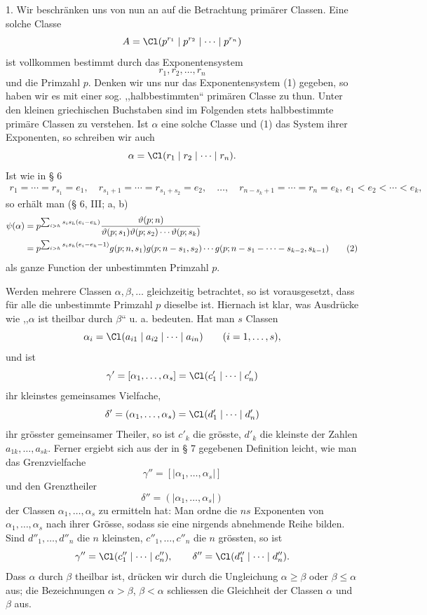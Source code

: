 1. Wir beschränken uns von nun an auf die Betrachtung primärer Classen. Eine solche Classe
\[
 A=\Cl(p^{r_1}\mid p^{r_2}\mid\cdots\mid p^{r_n})
\]
ist vollkommen bestimmt durch das Exponentensystem
\begin{equation}
 r_1,r_2,\ldots,r_n
\tag{1}
\end{equation}
und die Primzahl $p$. Denken wir uns nur das Exponentensystem (1) gegeben, so haben wir es mit einer sog. ,,halbbestimmten`` primären Classe zu thun. Unter den kleinen griechischen Buchstaben sind im Folgenden stets halbbestimmte primäre Classen zu verstehen. Ist $\alpha$ eine solche Classe und (1) das System ihrer Exponenten, so schreiben wir auch
\[
 \alpha=\Cl(r_1\mid r_2\mid\cdots\mid r_n).
\]
Ist wie in § 6
\[
\begin{gathered}
 r_1=\cdots=r_{s_1}=e_1,
 \quad r_{s_1+1}=\cdots=r_{s_1+s_2}=e_2,
 \quad \ldots,\quad
 r_{n-s_k+1}=\cdots=r_n=e_k,\
 e_1<e_2<\cdots<e_k,
\end{gathered}
\]
so erhält man (§ 6, III; a, b)
\begin{align}
\psi(\alpha)
&=p^{\sum_{i>h}s_i s_h(e_i-e_h)}
 {\vartheta(p;n)\over \vartheta(p;s_1)\vartheta(p;s_2)\cdots\vartheta(p;s_k)} \notag\\
&=p^{\sum_{i>h}s_i s_h(e_i-e_h-1)}
 g(p;n,s_1)g(p;n-s_1,s_2)\cdots
 g(p;n-s_1-\cdots-s_{k-2},s_{k-1})
\tag{2}
\end{align}
als ganze Function der unbestimmten Primzahl $p$.

Werden mehrere Classen $\alpha,\beta,\ldots$ gleichzeitig betrachtet, so ist vorausgesetzt, dass für alle die unbestimmte Primzahl $p$ dieselbe ist. Hiernach ist klar, was Ausdrücke wie ,,$\alpha$ ist theilbar durch $\beta$`` u. a. bedeuten. Hat man $s$ Classen
\[
 \alpha_i=\Cl(a_{i1}\mid a_{i2}\mid\cdots\mid a_{in})\qquad (i=1,\ldots,s),
\]
und ist
\[
 \gamma'=[\alpha_1,\ldots,\alpha_s]=\Cl(c'_1\mid\cdots\mid c'_n)
\]
ihr kleinstes gemeinsames Vielfache,
\[
 \delta'=(\alpha_1,\ldots,\alpha_s)=\Cl(d'_1\mid\cdots\mid d'_n)
\]
ihr grösster gemeinsamer Theiler, so ist $c'_k$ die grösste, $d'_k$ die kleinste der Zahlen $a_{1k},\ldots,a_{sk}$. Ferner ergiebt sich aus der in § 7 gegebenen Definition leicht, wie man das Grenzvielfache
\[
 \gamma''=[|\alpha_1,\ldots,\alpha_s|]
\]
und den Grenztheiler
\[
 \delta''=(|\alpha_1,\ldots,\alpha_s|)
\]
der Classen $\alpha_1,\ldots,\alpha_s$ zu ermitteln hat: Man ordne die $ns$ Exponenten von $\alpha_1,\ldots,\alpha_s$ nach ihrer Grösse, sodass sie eine nirgends abnehmende Reihe bilden. Sind $d''_1,\ldots,d''_n$ die $n$ kleinsten, $c''_1,\ldots,c''_n$ die $n$ grössten, so ist
\[
 \gamma''=\Cl(c''_1\mid\cdots\mid c''_n),\qquad
 \delta''=\Cl(d''_1\mid\cdots\mid d''_n).
\]
Dass $\alpha$ durch $\beta$ theilbar ist, drücken wir durch die Ungleichung $\alpha\ge\beta$ oder $\beta\le\alpha$ aus; die Bezeichnungen $\alpha>\beta$, $\beta<\alpha$ schliessen die Gleichheit der Classen $\alpha$ und $\beta$ aus.

